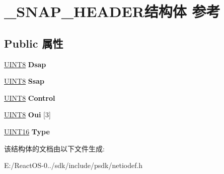 \hypertarget{struct___s_n_a_p___h_e_a_d_e_r}{}\section{\+\_\+\+S\+N\+A\+P\+\_\+\+H\+E\+A\+D\+E\+R结构体 参考}
\label{struct___s_n_a_p___h_e_a_d_e_r}
\subsection*{Public 属性}
\begin{DoxyCompactItemize}
\item 
\mbox{\label{struct___s_n_a_p___h_e_a_d_e_r_aacbb83adbc645353115c4ce8c87feda3}} 
\hyperlink{_processor_bind_8h_ab27e9918b538ce9d8ca692479b375b6a}{U\+I\+N\+T8} {\bfseries Dsap}
\item 
\mbox{\label{struct___s_n_a_p___h_e_a_d_e_r_a699e323393be53f93adc62f25464b766}} 
\hyperlink{_processor_bind_8h_ab27e9918b538ce9d8ca692479b375b6a}{U\+I\+N\+T8} {\bfseries Ssap}
\item 
\mbox{\label{struct___s_n_a_p___h_e_a_d_e_r_a42d6bea32da179d87beadfbdd6a6248e}} 
\hyperlink{_processor_bind_8h_ab27e9918b538ce9d8ca692479b375b6a}{U\+I\+N\+T8} {\bfseries Control}
\item 
\mbox{\label{struct___s_n_a_p___h_e_a_d_e_r_aec5898e07b03644af4231d2b173f2c55}} 
\hyperlink{_processor_bind_8h_ab27e9918b538ce9d8ca692479b375b6a}{U\+I\+N\+T8} {\bfseries Oui} \mbox{[}3\mbox{]}
\item 
\mbox{\label{struct___s_n_a_p___h_e_a_d_e_r_a1155ae6d172e5d1450612463bfcd4e77}} 
\hyperlink{_processor_bind_8h_a09f1a1fb2293e33483cc8d44aefb1eb1}{U\+I\+N\+T16} {\bfseries Type}
\end{DoxyCompactItemize}


该结构体的文档由以下文件生成\+:\begin{DoxyCompactItemize}
\item 
E\+:/\+React\+O\+S-\/0../sdk/include/psdk/netiodef.\+h\end{DoxyCompactItemize}
